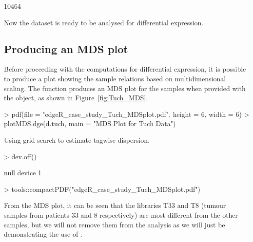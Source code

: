 \begin{Schunk}
\begin{Soutput}
[1] 10464
\end{Soutput}
\end{Schunk}

Now the dataset is ready to be analysed for differential expression.

\subsection{Producing an MDS plot}

Before proceeding with the computations for differential expression,
it is possible to produce a plot showing the sample relations based on
multidimensional scaling. The function  produces
an MDS plot for the samples when provided with the 
object, as shown in Figure~\ref{fig:Tuch_MDS}.

\begin{Schunk}
\begin{Sinput}
> pdf(file = "edgeR_case_study_Tuch_MDSplot.pdf", height = 6, width = 6)
> plotMDS.dge(d.tuch, main = "MDS Plot for Tuch Data")
\end{Sinput}
\begin{Soutput}
Using grid search to estimate tagwise dispersion. 
\end{Soutput}
\begin{Sinput}
> dev.off()
\end{Sinput}
\begin{Soutput}
null device 
          1 
\end{Soutput}
\begin{Sinput}
> tools::compactPDF("edgeR_case_study_Tuch_MDSplot.pdf")
\end{Sinput}
\end{Schunk}

From the MDS plot, it can be seen that the libraries T33 and T8
(tumour samples from patients 33 and 8 respectively) are most
different from the other samples, but we will not remove them from the
analysis as we will just be demonstrating the use of \edgeR.

